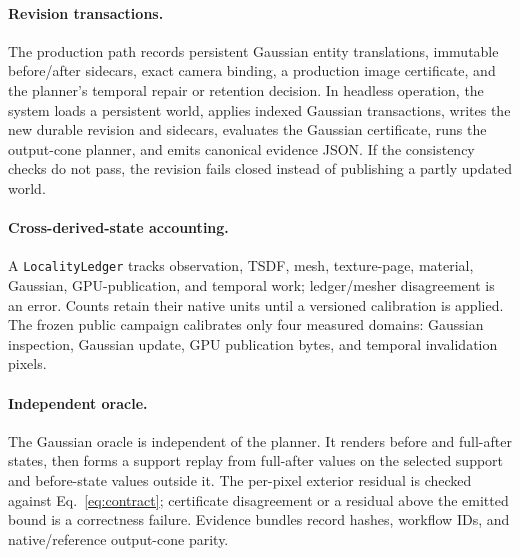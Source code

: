\documentclass[acmtog,nonacm]{acmart}
\begin{document}
\paragraph{Revision transactions.}
The production path records persistent Gaussian entity translations, immutable before/after sidecars, exact camera binding, a production image certificate, and the planner's temporal repair or retention decision. In headless operation, the system loads a persistent world, applies indexed Gaussian transactions, writes the new durable revision and sidecars, evaluates the Gaussian certificate, runs the output-cone planner, and emits canonical evidence JSON. If the consistency checks do not pass, the revision fails closed instead of publishing a partly updated world.

\paragraph{Cross-derived-state accounting.}
A \texttt{LocalityLedger} tracks observation, TSDF, mesh, texture-page, material, Gaussian, GPU-publication, and temporal work; ledger/mesher disagreement is an error. Counts retain their native units until a versioned calibration is applied. The frozen public campaign calibrates only four measured domains: Gaussian inspection, Gaussian update, GPU publication bytes, and temporal invalidation pixels.

\paragraph{Independent oracle.}
The Gaussian oracle is independent of the planner. It renders before and full-after states, then forms a support replay from full-after values on the selected support and before-state values outside it. The per-pixel exterior residual is checked against Eq.~\ref{eq:contract}; certificate disagreement or a residual above the emitted bound is a correctness failure. Evidence bundles record hashes, workflow IDs, and native/reference output-cone parity.
\end{document}
